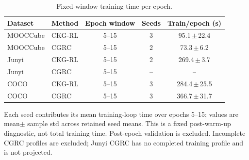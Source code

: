 \begin{table}[t]
\centering
\caption{Fixed-window training time per epoch.}
\label{tab:stable-epoch-timing}
\tablecaptiongap
\small
\setlength{\tabcolsep}{5pt}
\begin{tabular*}{\textwidth}{@{\extracolsep{\fill}}llccc}
\toprule
Dataset & Method & Epoch window & Seeds & Train/epoch (s) \\
\midrule
MOOCCube & CKG-RL & 5--15 & 3 & 95.1\,$\pm$\,22.4 \\
MOOCCube & CGRC & 5--15 & 2 & 73.3\,$\pm$\,6.2 \\
Junyi & CKG-RL & 5--15 & 2 & 269.4\,$\pm$\,3.7 \\
Junyi & CGRC & 5--15 & -- & -- \\
COCO & CKG-RL & 5--15 & 3 & 284.4\,$\pm$\,25.5 \\
COCO & CGRC & 5--15 & 3 & 366.7\,$\pm$\,31.7 \\
\bottomrule
\end{tabular*}
\vspace{2pt}
\parbox{\textwidth}{\footnotesize Each seed contributes its mean training-loop time over epochs 5--15; values are mean\(\pm\) sample std across retained seed means. This is a fixed post-warm-up diagnostic, not total training time. Post-epoch validation is excluded. Incomplete CGRC profiles are excluded; Junyi CGRC has no completed training profile and is not projected.}
\end{table}
